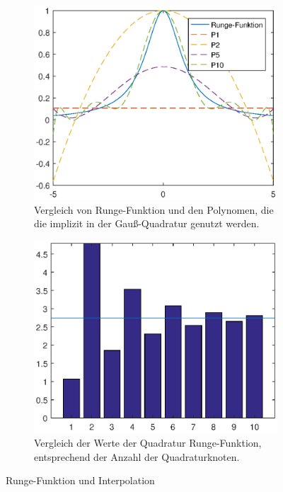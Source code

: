 \documentclass[french, 12pt, a4paper, onesided]{scrartcl}
\theoremstyle{plain}
\theoremstyle{definition}
\theoremstyle{remark}
\begin{document}
\begin{figure}[h]
	\centering
	\begin{subfigure}[b]{0.7\textwidth}
		\includegraphics[width=1\linewidth]{Runge-fkt-poly.eps}
		\caption{Vergleich von Runge-Funktion und den Polynomen, die die implizit in der Gauß-Quadratur genutzt werden.}
		\label{fig:RungePoly}
	\end{subfigure}
	\begin{subfigure}[b]{0.7\textwidth}
		\includegraphics[width=1\linewidth]{Runge-fkt-Quadratur.eps}
		\caption{Vergleich der Werte der Quadratur Runge-Funktion, entsprechend der Anzahl der Quadraturknoten.}
		\label{fig:RungeQuadratur}
	\end{subfigure}
	\caption{Runge-Funktion und Interpolation}
	\label{fig:RungeFkt}
\end{figure}
\end{document}
